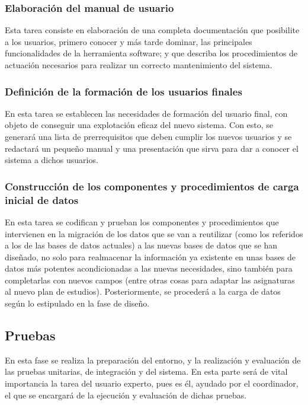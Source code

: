 \documentclass[11pt,a4paper,spanish,twoside]{book}
\begin{document}
\subsubsection{Elaboración del manual de usuario}
Esta tarea consiste en elaboración de una completa documentación que posibilite
a los usuarios, primero conocer y más tarde dominar, las principales
funcionalidades de la herramienta software; y que describa los procedimientos 
de actuación necesarios para realizar un correcto mantenimiento del sistema.

\subsubsection{Definición de la formación de los usuarios finales}
En esta tarea se establecen las necesidades de formación del usuario final, con
objeto de conseguir una explotación eficaz del nuevo sistema. Con esto, se 
generará una lista de prerrequisitos que deben cumplir los nuevos usuarios y 
se redactará un pequeño manual y una presentación que sirva para dar a conocer 
el sistema a dichos usuarios.

\subsubsection{Construcción de los componentes y procedimientos de carga
  inicial de datos}
En esta tarea se codifican y prueban los componentes y procedimientos que 
intervienen en la migración de los datos que se van a reutilizar (como los 
referidos a los de las bases de datos actuales) a las nuevas bases de datos 
que se han diseñado, no solo para realmacenar la información ya existente en
unas bases de datos más potentes acondicionadas a las nuevas necesidades, sino 
también para completarlas con nuevos campos (entre otras cosas para adaptar las
asignaturas al nuevo plan de estudios). Posteriormente, se procederá a la carga 
de datos según lo estipulado en la fase de diseño.

\subsection{Pruebas}
En esta fase se realiza la preparación del entorno, y la realización y 
evaluación de las pruebas unitarias, de integración y del sistema. En esta 
parte será de vital importancia la tarea del usuario experto, pues es él, 
ayudado por el coordinador, el que se encargará de la ejecución y evaluación de
dichas pruebas.
\end{document}
